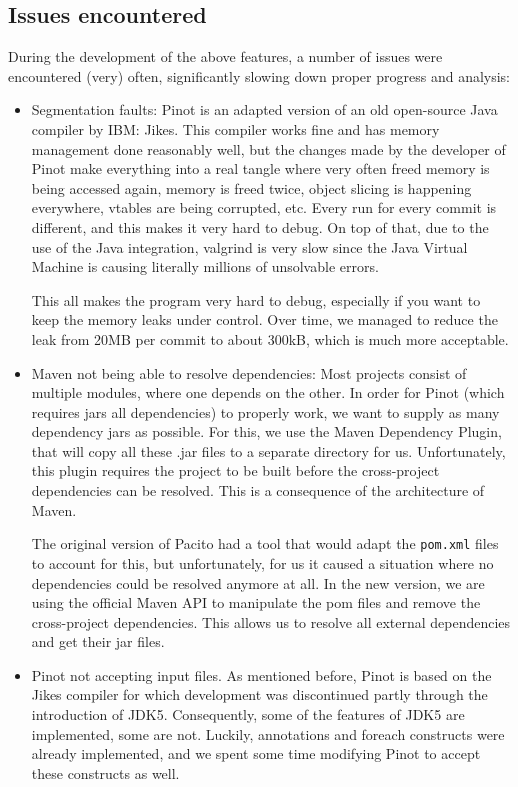 \subsection{Issues encountered}
During the development of the above features, a number of issues were encountered (very) often, significantly slowing down proper progress and analysis:
\begin{itemize}
    \item Segmentation faults: Pinot is an adapted version of an old open-source Java compiler by IBM: Jikes. This compiler works fine and has memory management done reasonably well, but the changes made by the developer of Pinot make everything into a real tangle where very often freed memory is being accessed again, memory is freed twice, object slicing is happening everywhere, vtables are being corrupted, etc. Every run for every commit is different, and this makes it very hard to debug. On top of that, due to the use of the Java integration, valgrind is very slow since the Java Virtual Machine is causing literally millions of unsolvable errors.
    
    This all makes the program very hard to debug, especially if you want to keep the memory leaks under control. Over time, we managed to reduce the leak from 20MB per commit to about 300kB, which is much more acceptable.
    
    \item Maven not being able to resolve dependencies: Most projects consist of multiple modules, where one depends on the other. In order for Pinot (which requires jars all dependencies) to properly work, we want to supply as many dependency jars as possible. For this, we use the Maven Dependency Plugin, that will copy all these .jar files to a separate directory for us. Unfortunately, this plugin requires the project to be built before the cross-project dependencies can be resolved. This is a consequence of the architecture of Maven.
    
    The original version of Pacito had a tool that would adapt the {\tt pom.xml} files to account for this, but unfortunately, for us it caused a situation where no dependencies could be resolved anymore at all. In the new version, we are using the official Maven API to manipulate the pom files and remove the cross-project dependencies. This allows us to resolve all external dependencies and get their jar files.
    
    \item Pinot not accepting input files. As mentioned before, Pinot is based on the Jikes compiler for which development was discontinued partly through the introduction of JDK5. Consequently, some of the features of JDK5 are implemented, some are not. Luckily, annotations and foreach constructs were already implemented, and we spent some time modifying Pinot to accept these constructs as well.
    

\end{itemize}
